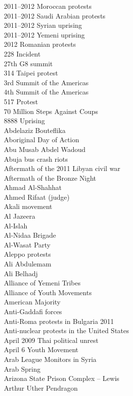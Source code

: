 2011–2012 Moroccan protests\\
2011–2012 Saudi Arabian protests\\
2011–2012 Syrian uprising\\
2011–2012 Yemeni uprising\\
2012 Romanian protests\\
228 Incident\\
27th G8 summit\\
314 Taipei protest\\
3rd Summit of the Americas\\
4th Summit of the Americas\\
517 Protest\\
70 Million Steps Against Coups\\
8888 Uprising\\
Abdelaziz Bouteflika\\
Aboriginal Day of Action\\
Abu Musab Abdel Wadoud\\
Abuja bus crash riots\\
Aftermath of the 2011 Libyan civil war\\
Aftermath of the Bronze Night\\
Ahmad Al-Shahhat\\
Ahmed Rifaat (judge)\\
Akali movement\\
Al Jazeera\\
Al-Islah\\
Al-Nidaa Brigade\\
Al-Wasat Party\\
Aleppo protests\\
Ali Abdulemam\\
Ali Belhadj\\
Alliance of Yemeni Tribes\\
Alliance of Youth Movements\\
American Majority\\
Anti-Gaddafi forces\\
Anti-Roma protests in Bulgaria 2011\\
Anti-nuclear protests in the United States\\
April 2009 Thai political unrest\\
April 6 Youth Movement\\
Arab League Monitors in Syria\\
Arab Spring\\
Arizona State Prison Complex – Lewis\\
Arthur Uther Pendragon\\
